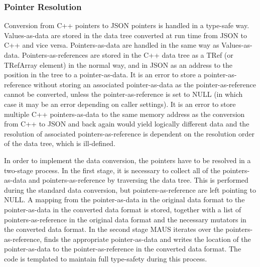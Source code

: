 \subsubsection{Pointer Resolution}
Conversion from C++ pointers to JSON pointers is handled in a type-safe way. Values-as-data are stored in the data tree converted at run time from JSON to C++ and vice versa. Pointers-as-data are handled in the same way as Values-as-data. Pointers-as-references are stored in the C++ data tree as a TRef (or TRefArray element) in the normal way, and in JSON as an address to the position in the tree to a pointer-as-data. It is an error to store a pointer-as-reference without storing an associated pointer-as-data as the pointer-as-reference cannot be converted, unless the pointer-as-reference is set to NULL (in which case it may be an error depending on caller settings). It is an error to store multiple C++ pointers-as-data to the same memory address as the conversion from C++ to JSON and back again would yield logically different data and the resolution of associated pointers-as-reference is dependent on the resolution order of the data tree, which is ill-defined.

In order to implement the data conversion, the pointers have to be resolved in a two-stage process. In the first stage, it is necessary to collect all of the pointers-as-data and pointers-as-reference by traversing the data tree. This is performed during the standard data conversion, but pointers-as-reference are left pointing to NULL. A mapping from the pointer-as-data in the original data format to the pointer-as-data in the converted data format is stored, together with a list of pointers-as-reference in the original data format and the necessary mutators in the converted data format. In the second stage MAUS iterates over the pointers-as-reference, finds the appropriate pointer-as-data and writes the location of the pointer-as-data to the pointer-as-reference in the converted data format. The code is templated to maintain full type-safety during this process.
 
